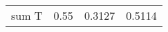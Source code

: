 \begin{table}
\begin{subtable}[t!]{0.5\textwidth}
\begin{tabular}{c| c| c | c }
sum T & 0.55  & {\color{Orange} 0.3127 } & {\color{Orange} 0.5114 } \\

\end{tabular}
\end{subtable}
\end{table}
